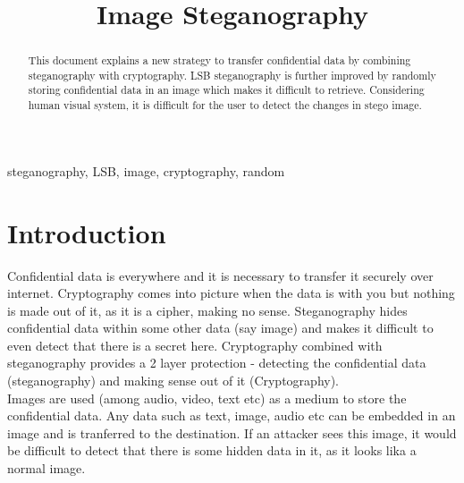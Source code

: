 \documentclass[conference]{IEEEtran}
\begin{document}
\title{Image Steganography\\
}

\author{
}

\maketitle

\begin{abstract}
This document explains a new strategy to transfer confidential data by combining steganography with cryptography.
LSB steganography is further improved by randomly storing confidential data in an image which makes it difficult to retrieve.
Considering human visual system, it is difficult for the user to detect the changes in stego image. \\
\end{abstract} 

\begin{IEEEkeywords}
steganography, LSB, image, cryptography, random
\end{IEEEkeywords}

\section{Introduction}
Confidential data is everywhere and it is necessary to transfer it securely over internet.
Cryptography comes into picture when the data is with you but nothing is made out of it, as it is a cipher, making no sense.
Steganography hides confidential data within some other data (say image) and makes it difficult to even detect that there is a secret here.
Cryptography combined with steganography provides a 2 layer protection - detecting the confidential data (steganography) and making sense out of it (Cryptography).\\

Images are used (among audio, video, text etc) as a medium to store the confidential data.
Any data such as text, image, audio etc can be embedded in an image and is tranferred to the destination.
If an attacker sees this image, it would be difficult to detect that there is some hidden data in it, as it looks lika a normal image.\\
\end{document}
